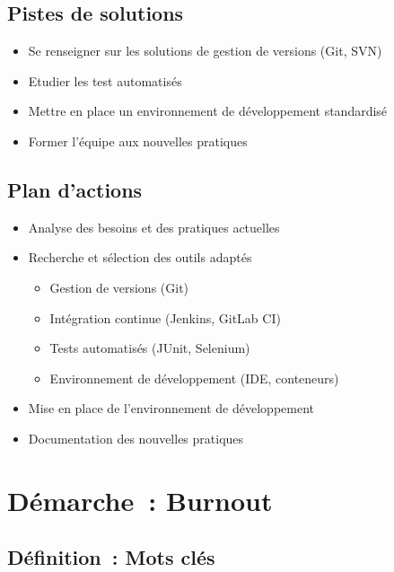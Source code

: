 \subsection*{Pistes de solutions}
{}
\begin{itemize}
	\item Se renseigner sur les solutions de gestion de versions (Git, SVN)
	\item Etudier les test automatisés
	\item Mettre en place un environnement de développement standardisé
	\item Former l'équipe aux nouvelles pratiques
\end{itemize}

\subsection*{Plan d'actions}
{}
\begin{itemize}
	\item Analyse des besoins et des pratiques actuelles
	\item Recherche et sélection des outils adaptés
	\begin{itemize}
		\item Gestion de versions (Git)
		\item Intégration continue (Jenkins, GitLab CI)
		\item Tests automatisés (JUnit, Selenium)
		\item Environnement de développement (IDE, conteneurs)
	\end{itemize}
	\item Mise en place de l'environnement de développement
	\item Documentation des nouvelles pratiques
\end{itemize}

\newpage
\section*{Démarche~: Burnout}


\subsection*{Définition~: Mots clés}
{}

